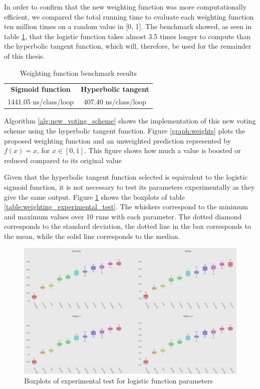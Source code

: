 In order to confirm that the new weighting function was more computationally efficient, we compared the total running time to evaluate each weighting function ten million times on a random value in [0, 1]. The benchmark showed, as seen in table \ref{table:weight_benchmark}, that the logistic function takes almost 3.5 times longer to compute than the hyperbolic tangent function, which will, therefore, be used for the remainder of this thesis.

\begin{table}[]
\centering
\caption{\label{table:weight_benchmark}Weighting function benchmark results}
\begin{tabular}{|c|c|}
\hline
\textbf{Sigmoid function} & \textbf{Hyperbolic tangent} \\ \hhline{==}
1441.05 ns/class/loop & 407.40 ns/class/loop \\ \hline
\end{tabular}
\end{table}

Algorithm \ref{alg:new_voting_scheme} shows the implementation of this new voting scheme using the hyperbolic tangent function. Figure \ref{graph:weights} plots the proposed weighting function and an unweighted prediction represented by $f(x) =x$, for  $x \in [0,1]$. This figure shows how much a value is boosted or reduced compared to its original value

Given that the hyperbolic tangent function selected is equivalent to the logistic sigmoid function, it is not necessary to test its parameters experimentally as they give the same output. Figure \ref{fig:boxplots_params} shows the boxplots of table \ref{table:weighting_experimental_test}. The whiskers correspond to the minimum and maximum values over 10 runs with each parameter. The dotted diamond corresponds to the standard deviation, the dotted line in the box corresponds to the mean, while the solid line corresponds to the median.

\begin{figure}
  \includegraphics[width=\linewidth]{./images/chapter3/boxplots_params}
\caption{\label{fig:boxplots_params}Boxplots of experimental test for logistic function parameters}
\end{figure}


